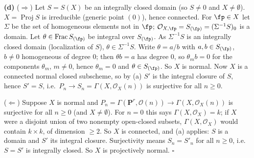 \documentclass[11pt]{article}
\begin{document}
\textbf{(d)} ($\Rightarrow$) Let $S=S(X)$ be an integrally closed domain (so $S\ne0$ and $X\neq\emptyset$). $X=\operatorname{Proj}S$ is irreducible (generic point $(0)$), hence connected. For $\fp\in X$ let $\Sigma$ be the set of homogeneous elements not in $\fp$; $\mathcal O_{X,\fp}=S_{(\fp)}=(\Sigma^{-1}S)_0$ is a domain. Let $\theta\in\operatorname{Frac}S_{(\fp)}$ be integral over $S_{(\fp)}$. As $\Sigma^{-1}S$ is an integrally closed domain (localization of $S$), $\theta\in\Sigma^{-1}S$. Write $\theta=a/b$ with $a,b\in S_{(\fp)}$, $b\ne0$ homogeneous of degree $0$; then $\theta b=a$ has degree $0$, so $\theta_mb=0$ for the components $\theta_m$, $m\neq0$, hence $\theta_m=0$ and $\theta\in S_{(\fp)}$. So $X$ is normal. Now $X$ is a connected normal closed subscheme, so by (a) $S'$ is the integral closure of $S$, hence $S'=S$, i.e.\ $P_n\to S_n=\Gamma(X,\mathcal O_X(n))$ is surjective for all $n\ge0$.

($\Leftarrow$) Suppose $X$ is normal and $P_n=\Gamma(\mathbf P^r,\mathcal O(n))\to\Gamma(X,\mathcal O_X(n))$ is surjective for all $n\ge0$ (and $X\ne\emptyset$). For $n=0$ this says $\Gamma(X,\mathcal O_X)=k$; if $X$ were a disjoint union of two nonempty open-closed subsets, $\Gamma(X,\mathcal O_X)$ would contain $k\times k$, of dimension $\ge2$. So $X$ is connected, and (a) applies: $S$ is a domain and $S'$ its integral closure. Surjectivity means $S_n=S'_n$ for all $n\ge0$, i.e.\ $S=S'$ is integrally closed. So $X$ is projectively normal. \hfill$\square$
\end{document}
